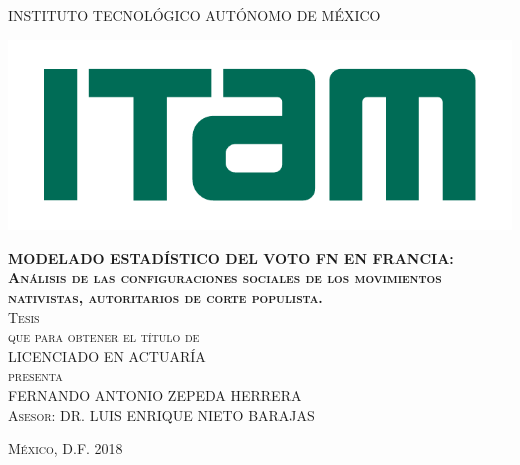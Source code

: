\begin{titlepage}

\begin{center}

\large{INSTITUTO TECNOLÓGICO AUTÓNOMO DE MÉXICO}\\

\begin{center}
	\includegraphics[scale=0.8]{Figs/logo-ITAM.pdf}
\end{center}

\textsc{\large \textbf{MODELADO ESTADÍSTICO DEL VOTO FN EN FRANCIA: \\
Análisis de las configuraciones sociales de los movimientos nativistas, autoritarios de corte populista.}}\\[2em]

\textsc{\large Tesis}\\[1em]

\textsc{que para obtener el título de}\\[1em]

\textsc{LICENCIADO EN ACTUARÍA}\\[1em]

\textsc{presenta}\\[1em]

\textsc{\Large FERNANDO ANTONIO ZEPEDA HERRERA}\\[1em]

\textsc{\large Asesor: DR. LUIS ENRIQUE NIETO BARAJAS}

\end{center}

\vspace*{\fill}
\textsc{México, D.F. \hspace*{\fill} 2018}

\end{titlepage}